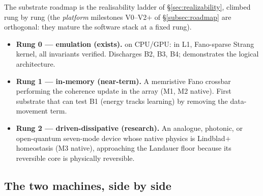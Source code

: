 The substrate roadmap is the realisability ladder of \S\ref{sec:realizability},
climbed rung by rung (the \emph{platform} milestones V0--V2$+$ of
\S\ref{subsec:roadmap} are orthogonal: they mature the software stack at a
fixed rung).

\begin{itemize}[leftmargin=1.5em,itemsep=1pt]
  \item \textbf{Rung 0 --- emulation (exists).} \SYNARC{} on CPU/GPU: \DM{} in
        L1, Fano-sparse Strang kernel, all invariants verified. Discharges
        B2, B3, B4; demonstrates the logical architecture.
  \item \textbf{Rung 1 --- in-memory (near-term).} A memristive Fano crossbar
        performing the coherence update in the array (M1, M2 native). First
        substrate that can test B1 (energy tracks learning) by removing the
        data-movement term.
  \item \textbf{Rung 2 --- driven-dissipative (research).} An analogue, photonic,
        or open-quantum seven-mode device whose native physics is
        Lindblad$+$homeostasis (M3 native), approaching the Landauer floor
        because its reversible core is physically reversible.
\end{itemize}

\subsection{The two machines, side by side}

